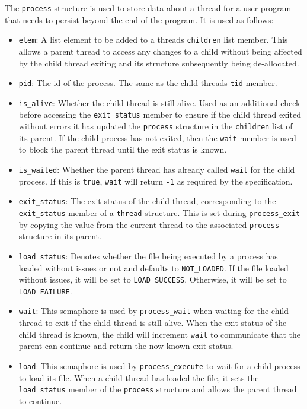 \documentclass{article}
\begin{document}
The \verb!process! structure is used to store data about a thread for a user program that needs to persist beyond the end of the program. It is used as follows:

\begin{itemize}
    \item \verb!elem!: A list element to be added to a threads \verb!children! list member. This allows a parent thread to access any changes to a child without being affected by the child thread exiting and its structure subsequently being de-allocated.

    \item \verb!pid!: The id of the process. The same as the child threads \verb!tid! member.

    \item \verb!is_alive!: Whether the child thread is still alive. Used as an additional check before accessing the \verb!exit_status! member to ensure if the child thread exited without errors it has updated the \verb!process! structure in the \verb!children! list of its parent. If the child process has not exited, then the \verb!wait! member is used to block the parent thread until the exit status is known.

    \item \verb!is_waited!: Whether the parent thread has already called \verb!wait! for the child process. If this is \verb!true!, \verb!wait! will return \verb!-1! as required by the specification.

    \item \verb!exit_status!: The exit status of the child thread, corresponding to the \verb!exit_status! member of a \verb!thread! structure. This is set during \verb!process_exit! by copying the value from the current thread to the associated \verb!process! structure in its parent.

    \item \verb!load_status!: Denotes whether the file being executed by a process has loaded without issues or not and defaults to \verb!NOT_LOADED!. If the file loaded without issues, it will be set to \verb!LOAD_SUCCESS!. Otherwise, it will be set to \verb!LOAD_FAILURE!.

    \item \verb!wait!: This semaphore is used by \verb!process_wait! when waiting for the child thread to exit if the child thread is still alive. When the exit status of the child thread is known, the child will increment \verb!wait! to communicate that the parent can continue and return the now known exit status.

    \item \verb!load!: This semaphore is used by \verb!process_execute! to wait for a child process to load its file. When a child thread has loaded the file, it sets the \verb!load_status! member of the \verb!process! structure and allows the parent thread to continue.
\end{itemize}
\end{document}
